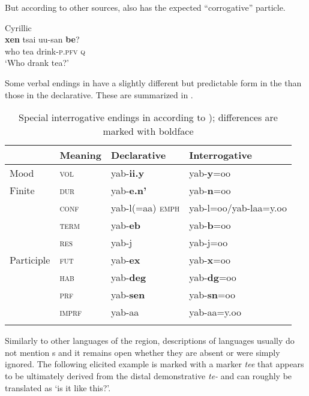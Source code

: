 \noindent But according to other sources,  also has the expected “corrogative” particle.

\ea%
    \label{ex:mong:20}
    Cyrillic  \\
    \gll \textbf{{xen}} tsai  uu-san \textbf{{be}}?\\
    who  tea  drink-\textsc{p}.\textsc{pfv}  \textsc{q}\\
    \glt ‘Who drank tea?’ \citep[171]{Svantesson2003}
    \z

Some verbal endings in  have a slightly different but predictable form in the  than those in the declarative. These are summarized in .

\begin{table}
\caption{Special interrogative endings in  according to \cite[183f., 255, 298]{Janhunen2012c}); differences are marked with boldface}
\label{tab:mong:1}

\begin{tabularx}{\textwidth}{XXXl}
\lsptoprule
& \textbf{Meaning} & \textbf{Declarative} & \textbf{Interrogative}\\
\midrule
Mood & \textsc{vol} & yab-\textbf{ii.y} & yab-\textbf{y}=oo\\
Finite & \textsc{dur} & yab-\textbf{e.n’} & yab-\textbf{n}=oo\\
& \textsc{conf} & yab-l(=aa) \textsc{emph} & yab-l=oo/yab-laa=y.oo\\
& \textsc{term} & yab-\textbf{eb} & yab-\textbf{b}=oo\\
& \textsc{res} & yab-j & yab-j=oo\\
Participle & \textsc{fut} & yab-\textbf{ex} & yab-\textbf{x}=oo\\
& \textsc{hab} & yab-\textbf{deg} & yab-\textbf{dg}=oo\\
& \textsc{prf} & yab-\textbf{sen} & yab-\textbf{sn}=oo\\
& \textsc{imprf} & yab-aa & yab-aa=y.oo\\
\lspbottomrule
\end{tabularx}
\end{table}

Similarly to other languages of the region, descriptions of  languages usually do not mention s and it remains open whether they are absent or were simply ignored. The following elicited example is marked with a marker \textit{tee} that appears to be ultimately derived from the distal demonstrative \textit{te-} and can roughly be translated as ‘is it like this?’.

